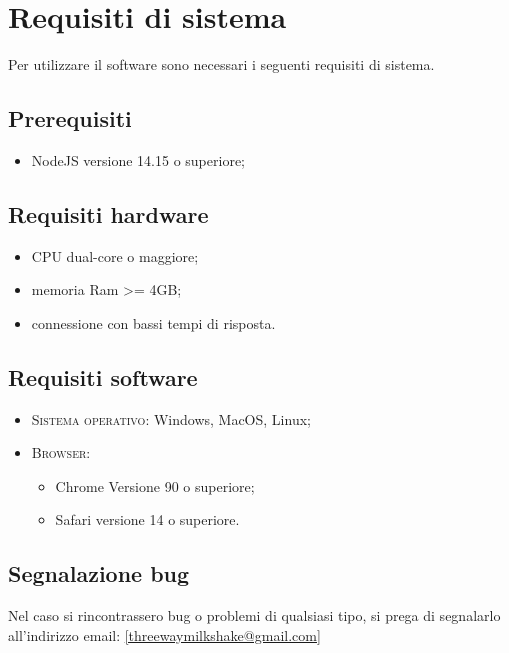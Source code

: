 \section{Requisiti di sistema}
Per utilizzare il software sono necessari i seguenti requisiti di sistema.
\subsection{Prerequisiti}
    \begin{itemize}
        \item NodeJS versione 14.15 o superiore;
    \end{itemize}
\subsection{Requisiti hardware}
\begin{itemize}
	\item CPU dual-core o maggiore;
	\item memoria Ram >= 4GB;
	\item connessione con bassi tempi di risposta.
\end{itemize}
\subsection{Requisiti software}
\begin{itemize}
    \item \textsc{Sistema operativo}: Windows, MacOS, Linux;
    \item \textsc{Browser}: 
    \begin{itemize}
        \item Chrome Versione 90 o superiore;
        \item Safari versione 14 o superiore.
    \end{itemize}
\end{itemize}

\subsection{Segnalazione bug}
Nel caso si rincontrassero bug o problemi di qualsiasi tipo, si prega di segnalarlo all'indirizzo email: \ref{threewaymilkshake@gmail.com}